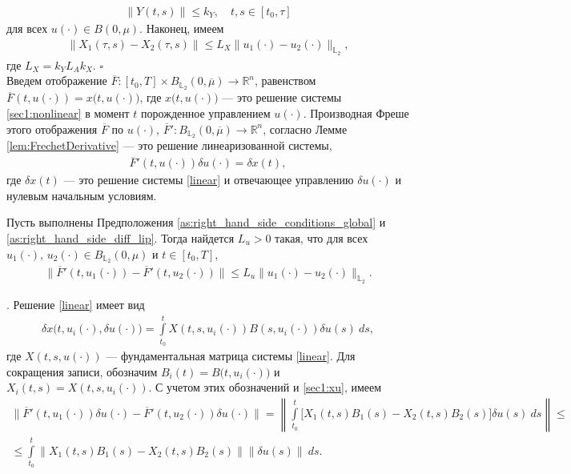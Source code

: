 \documentclass[../main.tex]{subfiles}
\begin{document}
		\begin{gather*}
			\|Y(t,s)\| \leqslant k_Y, \quad t,s \in [t_0, \tau]
		\end{gather*}
		для всех $u(\cdot) \in B(0,\mu)$. Наконец, имеем 
		\begin{gather*}
			\| X_1(\tau,s) - X_2(\tau,s) \| \leqslant L_X \| u_1(\cdot) - u_2(\cdot) \|_{\mathbb{L}_2}, 
		\end{gather*} 
	где $ L_X = k_Y L_A k_X$. \hfill$\square$\\[1ex]%
	Введем отображение $\overline{F}: [t_0,T]  \times B_{\mathbb{L}_2}(0,\overline{\mu}) \to \mathbb{R}^n$, равенством $\overline{F}(t, u(\cdot)) = x \big(t, u(\cdot)\big) $, где $x \big(t, u(\cdot)\big)$ --- это решение системы \eqref{sec1:nonlinear} в момент $t$ порожденное управлением $u(\cdot)$.  Производная Фреше этого отображения $\overline{F}$ по $u(\cdot)$, $\overline{F}': B_{\mathbb{L}_2}(0,\overline{\mu}) \to \mathbb{R}^n $, согласно Лемме \ref{lem:FrechetDerivative} --- это решение линеаризованной системы, 
	\begin{gather}\label{dF}
		\overline{F}'(t, u(\cdot)) \delta u(\cdot) = \delta x(t), 
	\end{gather}
	где $\delta x(t)$ --- это решение системы \eqref{linear} и отвечающее управлению $\delta u(\cdot)$ и нулевым начальным условиям.
	\begin{lemma}\label{lem:lip_dx_global}
		Пусть выполнены Предположения \ref{as:right_hand_side_conditions_global} и \ref{as:right_hand_side_diff_lip}.  Тогда найдется  $L_u > 0$ такая, что для всех  $u_1(\cdot),\, u_2(\cdot) \in B_{\mathbb{L}_2}(0,\mu)$ и $t \in [t_0,T]$, 
		\begin{gather*}
			\Big\| \overline{F}'(t, u_1(\cdot)) - \overline{F}'(t, u_2(\cdot)) \Big\| \leqslant L_u \| u_1(\cdot) - u_2(\cdot) \|_{\mathbb{L}_2}.
		\end{gather*}
	\end{lemma}
	\doc. 
	Решение \eqref{linear} имеет вид
	\begin{gather}\label{sec1:xu}
		\delta x\big(t, u_i(\cdot),\delta u(\cdot)\big) = \int\limits_{t_0}^{t}  X(t,s,u_i(\cdot)) B(s, u_i(\cdot)) \delta u(s) \ ds,
	\end{gather}
	где $X(t,s,u(\cdot)) $ --- фундаментальная матрица системы \eqref{linear}. 
	Для сокращения записи, обозначим $B_i(t) = B\big(t, u_i(\cdot)\big) $ и $ X_i(t,s) = X(t, s, u_i(\cdot))$.  С учетом этих обозначений и \eqref{sec1:xu}, имеем
	\begin{gather*}
				\Big\| \overline{F}'(t, u_1(\cdot)) \delta u(\cdot) - \overline{F}'(t, u_2(\cdot)) \delta u(\cdot) \Big\| =
				  \left\|  \int\limits_{t_0}^{t}  \Big[ X_1(t,s) B_1(s) - X_2(t,s) B_2(s) \Big] \delta u(s) \ ds \right\|  \leqslant \\ \leqslant
				   \int\limits_{t_0}^{t}  \Big\|  X_1(t,s) B_1(s) - X_2(t,s) B_2(s) \Big\| \left\|  \delta u(s) \right\| \ ds.
	\end{gather*}
\end{document}
